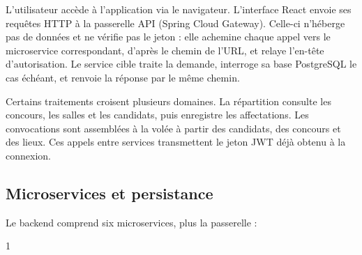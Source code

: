 \begin{onehalfspace}
L'utilisateur accède à l'application via le navigateur. L'interface React envoie ses requêtes HTTP à la passerelle API (Spring Cloud Gateway). Celle-ci n'héberge pas de données et ne vérifie pas le jeton : elle achemine chaque appel vers le microservice correspondant, d'après le chemin de l'URL, et relaye l'en-tête d'autorisation. Le service cible traite la demande, interroge sa base PostgreSQL le cas échéant, et renvoie la réponse par le même chemin.

Certains traitements croisent plusieurs domaines. La répartition consulte les concours, les salles et les candidats, puis enregistre les affectations. Les convocations sont assemblées à la volée à partir des candidats, des concours et des lieux. Ces appels entre services transmettent le jeton JWT déjà obtenu à la connexion.

\subsection{Microservices et persistance}

Le backend comprend six microservices, plus la passerelle :

\begin{table}[H]
\centering
\caption{Composants du backend}
\label{tab:composants-backend}
\begin{spacing}{1}
\end{spacing}
\end{table}


\end{onehalfspace}
